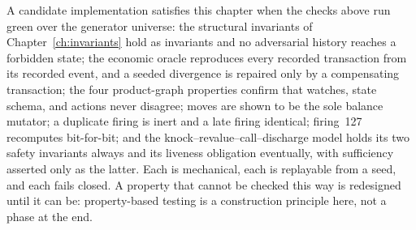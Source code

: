 A candidate implementation satisfies this chapter when the checks above run green over the
generator universe: the structural invariants of Chapter~\ref{ch:invariants} hold as
invariants and no adversarial history reaches a forbidden state; the economic oracle
reproduces every recorded transaction from its recorded event, and a seeded divergence is
repaired only by a compensating transaction; the four product-graph properties confirm that
watches, state schema, and actions never disagree; moves are shown to be the sole balance
mutator; a duplicate firing is inert and a late firing identical; firing~127 recomputes
bit-for-bit; and the knock--revalue--call--discharge model holds its two safety invariants
always and its liveness obligation eventually, with sufficiency asserted only as the latter.
Each is mechanical, each is replayable from a seed, and each fails closed. A property that
cannot be checked this way is redesigned until it can be: property-based testing is a
construction principle here, not a phase at the end.
